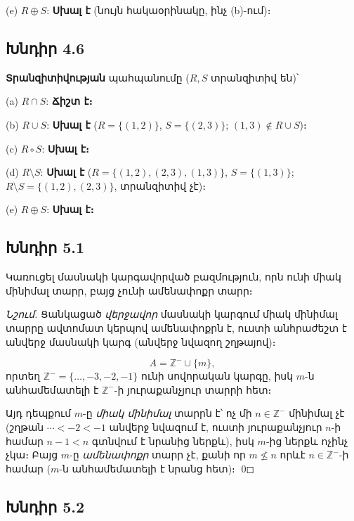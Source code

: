 (e) $R\oplus S$: \textbf{Սխալ է} (նույն հակաօրինակը, ինչ (b)-ում)։


\subsection*{Խնդիր 4.6}

\textbf{Տրանզիտիվության} պահպանումը ($R,S$ տրանզիտիվ են)՝

(a) $R\cap S$: \textbf{Ճիշտ է։}

(b) $R\cup S$: \textbf{Սխալ է} ($R=\{(1,2)\}$, $S=\{(2,3)\}$; $(1,3)\notin R\cup S$)։

(c) $R\circ S$: \textbf{Սխալ է։}

(d) $R\setminus S$: \textbf{Սխալ է} ($R=\{(1,2),(2,3),(1,3)\}$, $S=\{(1,3)\}$; $R\setminus S=\{(1,2),(2,3)\}$, տրանզիտիվ չէ)։

(e) $R\oplus S$: \textbf{Սխալ է։}


\subsection*{Խնդիր 5.1}

Կառուցել մասնակի կարգավորված բազմություն, որն ունի միակ մինիմալ տարր, բայց չունի ամենափոքր տարր։

\emph{Նշում.} Ցանկացած \emph{վերջավոր} մասնակի կարգում միակ մինիմալ տարրը ավտոմատ կերպով ամենափոքրն է, ուստի անհրաժեշտ է անվերջ մասնակի կարգ (անվերջ նվազող շղթայով)։

\[\boxed{A=\mathbb{Z}^-\cup\{m\}},\]
որտեղ $\mathbb{Z}^-=\{\ldots,-3,-2,-1\}$ ունի սովորական կարգը, իսկ $m$-ն անհամեմատելի է $\mathbb{Z}^-$-ի յուրաքանչյուր տարրի հետ։

Այդ դեպքում $m$-ը \emph{միակ մինիմալ} տարրն է՝ ոչ մի $n\in\mathbb{Z}^-$ մինիմալ չէ (շղթան $\cdots<-2<-1$ անվերջ նվազում է, ուստի յուրաքանչյուր $n$-ի համար $n-1<n$ գտնվում է նրանից ներքև), իսկ $m$-ից ներքև ոչինչ չկա։ Բայց $m$-ը \emph{ամենափոքր} տարր չէ, քանի որ $m\not\le n$ որևէ $n\in\mathbb{Z}^-$-ի համար ($m$-ն անհամեմատելի է նրանց հետ)։ \qed


\subsection*{Խնդիր 5.2}

